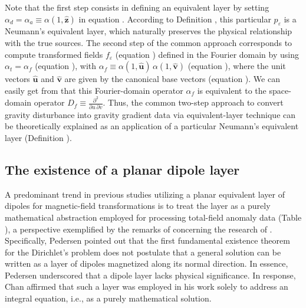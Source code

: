 Note that the first step consists in defining an equivalent layer 
by setting $\alpha_{d} = \alpha_{a} \equiv \alpha(1, \hat{\mathbf{z}})$ in equation .
According to Definition , this particular $p_{\varepsilon}$ is a Neumann's equivalent layer,
which naturally preserves the physical relationship with the true sources.
The second step of the common approach corresponds to 
compute transformed fields $f_{\varepsilon}$ (equation ) 
defined in the Fourier domain by using $\alpha_{t} = \alpha_{f}$ (equation ), with 
$\alpha_{f} \equiv \alpha(1, \hat{\mathbf{u}}) \, \alpha(1, \hat{\mathbf{v}})$ (equation ), 
where the unit vectors $\hat{\mathbf{u}}$ and $\hat{\mathbf{v}}$ are given by the canonical base vectors 
(equation ).
We can easily get from  that this Fourier-domain operator $\alpha_{f}$ is equivalent to the 
space-domain operator $D_{f} \equiv \tfrac{\partial^{2}}{\partial u \, \partial v}$.
Thus, the common two-step approach to convert gravity disturbance into gravity
gradient data via equivalent-layer technique can be theoretically explained as an application of 
a particular Neumann's equivalent layer (Definition ).


\subsection{The existence of a planar dipole layer}


A predominant trend in previous studies utilizing a planar equivalent layer of dipoles for magnetic-field transformations 
is to treat the layer as a purely mathematical abstraction employed for processing total-field anomaly data (Table ), 
a perspective exemplified by the remarks of \citet{pedersen1989} concerning the research of 
\citet{bhattacharyya_chan1977}.
Specifically, Pedersen pointed out that the first fundamental existence theorem for the Dirichlet's 
problem does not postulate that a general solution can be written as a layer of dipoles magnetized along its 
normal direction. In essence, Pedersen underscored that a dipole layer lacks physical significance.
In response, Chan affirmed that such a layer was employed in his work 
solely to address an integral equation, i.e., as a purely mathematical solution.

